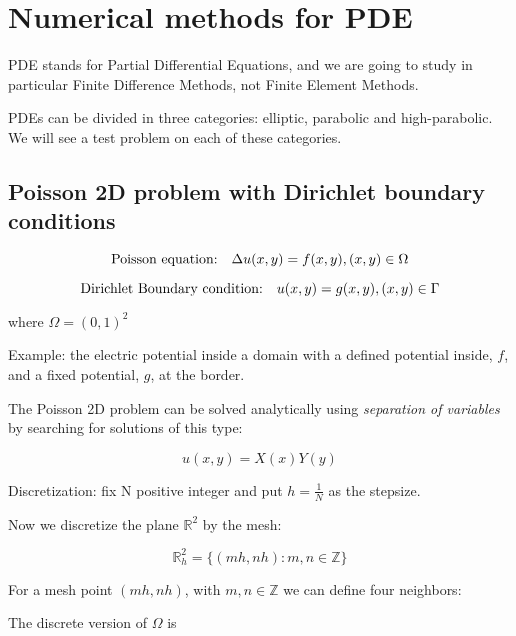 \chapter{Numerical methods for PDE}

PDE stands for Partial Differential Equations, and we are going to study in particular Finite Difference Methods, not Finite Element Methods.

PDEs can be divided in three categories: elliptic, parabolic and high-parabolic. We will see a test problem on each of these categories.

\section{Poisson 2D problem with Dirichlet boundary conditions}
\begin{equation}
\text{Poisson equation:\quad} \Delta u(x, y) = f(x, y), (x, y) \in \Omega
\end{equation}

\begin{equation}
\text{Dirichlet Boundary condition:\quad} u(x, y) = g(x, y), (x, y) \in \Gamma
\end{equation}

where $\Omega = (0, 1)^2$


Example: the electric potential inside a domain with a defined potential inside, $f$, and a fixed potential, $g$, at the border.

The Poisson 2D problem can be solved analytically using \textit{separation of variables} by searching for solutions of this type:

\begin{equation}
	u(x, y) = X(x) Y(y)
\end{equation}

Discretization: fix N positive integer and put $h = \frac{1}{N}$ as the stepsize.

Now we discretize the plane $\mathbb{R}^2$ by the mesh:

\begin{equation}
	\mathbb{R}^2_h = \{(mh, nh): m,n \in \mathbb{Z}\}
\end{equation}


For a mesh point $(mh, nh)$, with $m, n \in \mathbb{Z}$ we can define four neighbors:


The discrete version of $\Omega$ is


